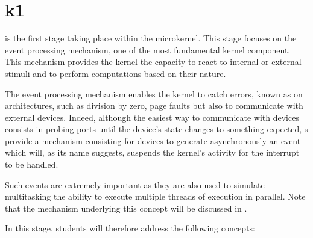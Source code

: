 %
%
%
%
%
%

%
%

\chapter{k1}
\label{chapter:k1}

 is the first stage taking place within the 
microkernel. This stage focuses on the event processing mechanism, one of
the most fundamental kernel component. This mechanism provides the kernel
the capacity to react to internal or external stimuli and to perform
computations based on their nature.

The event processing mechanism enables the kernel to catch errors, known
as  on  architectures, such as division by
zero, page faults \etc{} but also to communicate with external devices.
Indeed, although the easiest way to communicate with devices consists in
probing  ports until the device's state changes to something
expected, s provide a mechanism consisting for devices
to generate asynchronously an event which will, as its name suggests, suspends
the kernel's activity for the interrupt to be handled.

Such events are extremely important as they are also used to simulate
multitasking \ie{} the ability to execute multiple threads of execution
in parallel. Note that the mechanism underlying this concept will be
discussed in .

In this stage, students will therefore address the following concepts:

